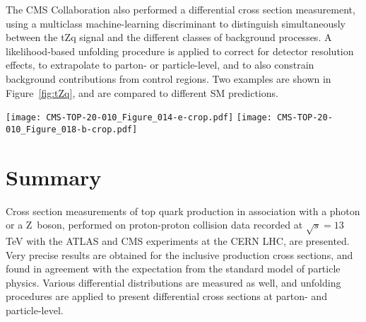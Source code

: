 \documentclass[12pt]{article}
\newcommand{\TeV}{\,TeV\xspace}
\newcommand{\sqrts}[1][13]{$\sqrt{s}=#1$\TeV}
\begin{document}
The CMS Collaboration also performed a differential cross section measurement, using a multiclass machine-learning discriminant to distinguish simultaneously between the tZq signal and the different classes of background processes.
A likelihood-based unfolding procedure is applied to correct for detector resolution effects, to extrapolate to parton- or particle-level, and to also constrain background contributions from control regions.
Two examples are shown in Figure~\ref{fig:tZq}, and are compared to different SM predictions.

\begin{center}
\texttt{[image: CMS-TOP-20-010\_Figure\_014-e-crop.pdf]}%
\hfill
\texttt{[image: CMS-TOP-20-010\_Figure\_018-b-crop.pdf]}%
\label{fig:tZq}
\end{center}


\section{Summary}

Cross section measurements of top quark production in association with a photon or a Z~boson, performed on proton-proton collision data recorded at \sqrts with the ATLAS and CMS experiments at the CERN LHC, are presented.
Very precise results are obtained for the inclusive production cross sections, and found in agreement with the expectation from the standard model of particle physics.
Various differential distributions are measured as well, and unfolding procedures are applied to present differential cross sections at parton- and particle-level.



%
\end{document}
